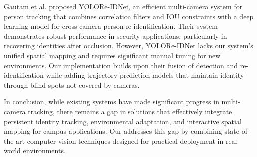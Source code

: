 Gautam et al. \cite{yoloreidnet} proposed YOLORe-IDNet, an efficient multi-camera system for person tracking that combines correlation filters and IOU constraints with a deep learning model for cross-camera person re-identification. Their system demonstrates robust performance in security applications, particularly in recovering identities after occlusion. However, YOLORe-IDNet lacks our system's unified spatial mapping and requires significant manual tuning for new environments. Our implementation builds upon their fusion of detection and re-identification while adding trajectory prediction models that maintain identity through blind spots not covered by cameras.

In conclusion, while existing systems have made significant progress in multi-camera tracking, there remains a gap in solutions that effectively integrate persistent identity tracking, environmental adaptation, and interactive spatial mapping for campus applications. Our \usevar{\srsTitle} addresses this gap by combining state-of-the-art computer vision techniques designed for practical deployment in real-world environments.